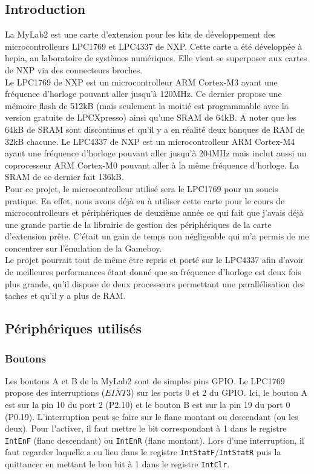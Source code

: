 \documentclass[a4paper]{article}
\begin{document}
\subsection{Introduction}
La MyLab2 est une carte d'extension pour les kits de développement des microcontrolleurs
LPC1769 et LPC4337 de NXP. Cette carte a été développée à hepia, au laboratoire
de systèmes numériques. Elle vient se superposer aux cartes de NXP via des connecteurs
broches. \\

Le LPC1769 de NXP est un microcontrolleur ARM Cortex-M3 ayant une fréquence d'horloge
pouvant aller jusqu'à 120MHz. Ce dernier propose une mémoire flash de 512kB (mais
seulement la moitié est programmable avec la version gratuite de LPCXpresso) ainsi
qu'une SRAM de 64kB. A noter que les 64kB de SRAM sont discontinus et qu'il y a en
réalité deux banques de RAM de 32kB chacune. 
Le LPC4337 de NXP est un microcontrolleur ARM Cortex-M4 ayant une fréquence d'horloge 
pouvant aller jusqu'à 204MHz mais inclut aussi un coprocesseur ARM Cortex-M0 pouvant
aller à la même fréquence d'horloge. La SRAM de ce dernier fait 136kB. \\

Pour ce projet, le microcontrolleur utilisé sera le LPC1769 pour un soucis pratique.
En effet, nous avons déjà eu à utiliser cette carte pour le cours de microcontrolleurs
et périphériques de deuxième année ce qui fait que j'avais déjà une grande partie de
la librairie de gestion des périphériques de la carte d'extension prête. C'était un
gain de temps non négligeable qui m'a permis de me concentrer sur l'émulation de
la Gameboy. \\

Le projet pourrait tout de même être repris et porté sur le LPC4337 afin d'avoir de
meilleures performances étant donné que sa fréquence d'horloge est deux fois plus
grande, qu'il dispose de deux processeurs permettant une parallélisation des taches
et qu'il y a plus de RAM.

\newpage


\subsection{Périphériques utilisés}
\subsubsection{Boutons}
Les boutons A et B de la MyLab2 sont de simples pins GPIO. Le LPC1769 propose
des interruptions ($\overline{EINT3}$) sur les ports 0 et 2 du GPIO. Ici, le bouton A est sur la pin
10 du port 2 (P2.10) et le bouton B est sur la pin 19 du port 0 (P0.19). L'interruption
peut se faire sur le flanc montant ou descendant (ou les deux). Pour l'activer,
il faut mettre le bit correspondant à 1 dans le registre \texttt{IntEnF}
(flanc descendant) ou \texttt{IntEnR} (flanc montant). Lors d'une interruption,
il faut regarder laquelle a eu lieu dans le registre \texttt{IntStatF}/\texttt{IntStatR}
puis la quittancer en mettant le bon bit à 1 dans le registre \texttt{IntClr}.
\end{document}
